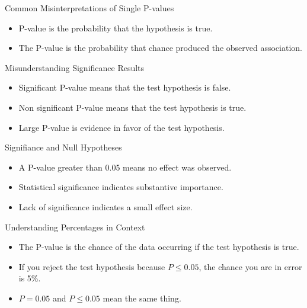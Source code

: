 \documentclass[aspectratio=169, 12pt]{beamer}
\begin{document}
\begin{frame}{Common Misinterpretations of Single P-values} %
\begin{itemize}
    \item P-value is the probability that the hypothesis is true.
    \vspace{0.5cm}
    \item The P-value is the probability that chance produced the observed association.
\end{itemize}
\end{frame}

\begin{frame}{Misunderstanding Significance Results} %
\begin{itemize}
    \item Significant P-value means that the test hypothesis is false.
    \vspace{0.5cm}
    \item Non significant P-value means that the test hypothesis is true.
    \vspace{0.5cm}
    \item Large P-value is evidence in favor of the test hypothesis.
\end{itemize}
\end{frame}

\begin{frame}{Signifiance and Null Hypotheses} %
\begin{itemize}
    \item A P-value greater than 0.05 means no effect was observed.
    \vspace{0.5cm}
    \item Statistical significance indicates substantive importance.
    \vspace{0.5cm}
    \item Lack of significance indicates a small effect size. 
\end{itemize}
\end{frame}

\begin{frame}{Understanding Percentages in Context} %
\begin{itemize}
    \item The P-value is the chance of the data occurring if the test hypothesis is true.
    \vspace{0.5cm}
    \item If you reject the test hypothesis because \( P \leq 0.05 \), the chance you are in error is 5\%.
    \vspace{0.5cm}
    \item \( P = 0.05 \) and \( P \leq 0.05 \) mean the same thing.
\end{itemize}
\end{frame}
\end{document}
